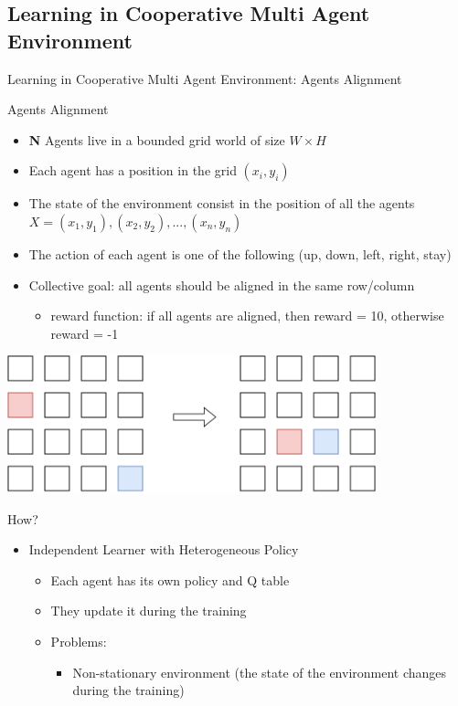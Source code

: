\documentclass[presentation, 8pt]{beamer}\mode<presentation>{\usetheme{AMSBolognaFC}}
\begin{document}
\subsection{Learning in Cooperative Multi Agent Environment}
\begin{frame}[allowframebreaks]{Learning in Cooperative Multi Agent Environment: Agents Alignment}
\begin{exampleblock}{Agents Alignment}
	\begin{itemize}
		\item \textbf{N} Agents live in a bounded grid world of size $W \times H$
		\item Each agent has a position in the grid $(x_i, y_i)$
		\item The state of the environment consist in the position of all the agents $X = {(x_1, y_1), (x_2, y_2), ..., (x_n, y_n)}$
		\item The action of each agent is one of the following (up, down, left, right, stay)
		\item Collective goal: all agents should be aligned in the same row/column
		\begin{itemize}
			\item reward function: if all agents are aligned, then reward = 10, otherwise reward = -1
		\end{itemize}
	\end{itemize}
\end{exampleblock}
\centering
\includegraphics[width=0.8\textwidth]{img/agent-modelling.pdf}
\begin{alertblock}{How?}
	\begin{itemize}
		\item Independent Learner with Heterogeneous Policy
		\begin{itemize}
			\item Each agent has its own policy and Q table
			\item They update it during the training
			\item Problems:
			\begin{itemize}
				\item Non-stationary environment (the state of the environment changes during the training)

\end{itemize}
\end{itemize}
\end{itemize}
\end{alertblock}
\end{frame}
\end{document}
